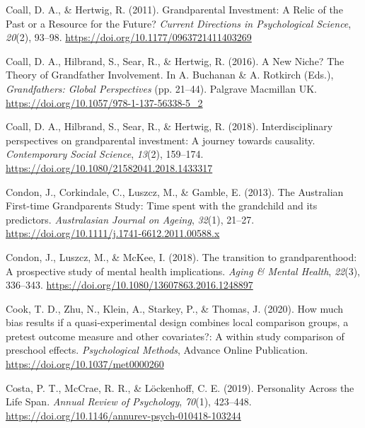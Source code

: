 \documentclass[
  english,
  man, noextraspace]{apa7}
\begin{document}
\leavevmode\hypertarget{ref-coallGrandparentalInvestmentRelic2011}{}%
Coall, D. A., \& Hertwig, R. (2011). Grandparental Investment: A Relic of the Past or a Resource for the Future? \emph{Current Directions in Psychological Science}, \emph{20}(2), 93--98. \url{https://doi.org/10.1177/0963721411403269}

\leavevmode\hypertarget{ref-coallNewNicheTheory2016}{}%
Coall, D. A., Hilbrand, S., Sear, R., \& Hertwig, R. (2016). A New Niche? The Theory of Grandfather Involvement. In A. Buchanan \& A. Rotkirch (Eds.), \emph{Grandfathers: Global Perspectives} (pp. 21--44). Palgrave Macmillan UK. \url{https://doi.org/10.1057/978-1-137-56338-5_2}

\leavevmode\hypertarget{ref-coallInterdisciplinaryPerspectivesGrandparental2018}{}%
Coall, D. A., Hilbrand, S., Sear, R., \& Hertwig, R. (2018). Interdisciplinary perspectives on grandparental investment: A journey towards causality. \emph{Contemporary Social Science}, \emph{13}(2), 159--174. \url{https://doi.org/10.1080/21582041.2018.1433317}

\leavevmode\hypertarget{ref-condonAustralianFirsttimeGrandparents2013}{}%
Condon, J., Corkindale, C., Luszcz, M., \& Gamble, E. (2013). The Australian First-time Grandparents Study: Time spent with the grandchild and its predictors. \emph{Australasian Journal on Ageing}, \emph{32}(1), 21--27. \url{https://doi.org/10.1111/j.1741-6612.2011.00588.x}

\leavevmode\hypertarget{ref-condonTransitionGrandparenthoodProspective2018}{}%
Condon, J., Luszcz, M., \& McKee, I. (2018). The transition to grandparenthood: A prospective study of mental health implications. \emph{Aging \& Mental Health}, \emph{22}(3), 336--343. \url{https://doi.org/10.1080/13607863.2016.1248897}

\leavevmode\hypertarget{ref-cookHowMuchBias2020}{}%
Cook, T. D., Zhu, N., Klein, A., Starkey, P., \& Thomas, J. (2020). How much bias results if a quasi-experimental design combines local comparison groups, a pretest outcome measure and other covariates?: A within study comparison of preschool effects. \emph{Psychological Methods}, Advance Online Publication. \url{https://doi.org/10.1037/met0000260}

\leavevmode\hypertarget{ref-costaPersonalityLifeSpan2019}{}%
Costa, P. T., McCrae, R. R., \& Löckenhoff, C. E. (2019). Personality Across the Life Span. \emph{Annual Review of Psychology}, \emph{70}(1), 423--448. \url{https://doi.org/10.1146/annurev-psych-010418-103244}
\end{document}
